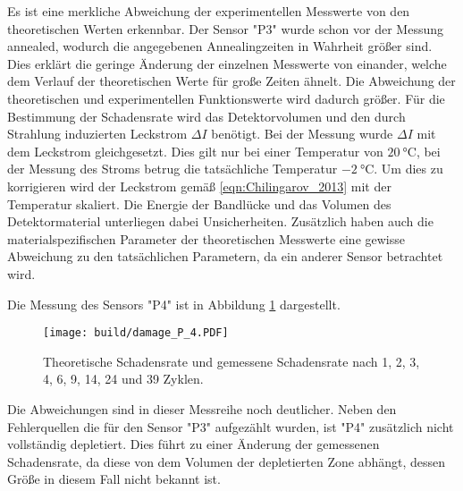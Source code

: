 Es ist eine merkliche Abweichung der experimentellen Messwerte von den theoretischen
Werten erkennbar. Der Sensor "P3" wurde schon vor der Messung annealed, wodurch
die angegebenen Annealingzeiten in Wahrheit größer sind. Dies erklärt die
geringe Änderung der einzelnen Messwerte von einander, welche dem
Verlauf der theoretischen Werte für große Zeiten ähnelt. Die Abweichung der theoretischen
und experimentellen Funktionswerte wird dadurch größer.
Für die Bestimmung der Schadensrate wird das Detektorvolumen und den durch
Strahlung induzierten Leckstrom $\Delta I$ benötigt. Bei der Messung wurde
$\Delta I$ mit dem Leckstrom gleichgesetzt. Dies gilt nur bei einer Temperatur
von $\SI{20}{\celsius}$, bei der Messung des Stroms betrug die tatsächliche Temperatur
$\SI{-2}{\celsius}$. Um dies zu korrigieren wird der Leckstrom gemäß \ref{eqn:Chilingarov_2013}
mit der Temperatur skaliert. Die Energie der Bandlücke und das Volumen des Detektormaterial
unterliegen dabei Unsicherheiten. Zusätzlich haben auch die materialspezifischen Parameter
der theoretischen Messwerte eine gewisse Abweichung zu den tatsächlichen Parametern, da
ein anderer Sensor betrachtet wird.

Die Messung des Sensors "P4" ist in Abbildung \ref{fig:P_4}
dargestellt.

\begin{figure}
    \texttt{[image: build/damage\_P\_4.PDF]}
\caption{Theoretische Schadensrate und gemessene Schadensrate nach 1, 2, 3, 4, 6, 9, 14, 24 und 39 Zyklen.}
\label{fig:P_4}
\end{figure}

Die Abweichungen sind in dieser Messreihe noch deutlicher. Neben den Fehlerquellen die
für den Sensor "P3" aufgezählt wurden, ist "P4" zusätzlich nicht vollständig depletiert.
Dies führt zu einer Änderung der gemessenen Schadensrate, da diese von dem Volumen
der depletierten Zone abhängt, dessen Größe in diesem Fall nicht bekannt ist.
